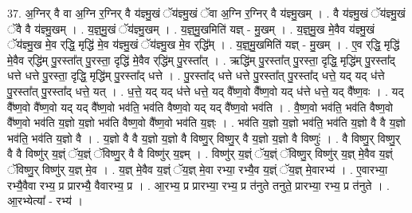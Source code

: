 \documentclass[17pt]{extarticle}
\begin{document}
37. अ॒ग्निर् वै वा अ॒ग्नि र॒ग्निर् वै य॑ज्ञ्मु॒खं ॅय॑ज्ञ्मु॒खं ॅवा अ॒ग्नि र॒ग्निर् वै य॑ज्ञ्मु॒खम् । . वै य॑ज्ञ्मु॒खं ॅय॑ज्ञ्मु॒खं ॅवै वै य॑ज्ञ्मु॒खम् । . य॒ज्ञ्॒मु॒खं ॅय॑ज्ञ्मु॒खम् । . य॒ज्ञ्॒मु॒खमिति॑ यज्ञ् - मु॒खम् । . य॒ज्ञ्॒मु॒ख मे॒वैव य॑ज्ञ्मु॒खं ॅय॑ज्ञ्मु॒ख मे॒व र्‌द्धि॒ मृद्धि॑ मे॒व य॑ज्ञ्मु॒खं ॅय॑ज्ञ्मु॒ख मे॒व र्‌द्धि᳚म् । . य॒ज्ञ्॒मु॒खमिति॑ यज्ञ् - मु॒खम् । . ए॒व र्‌द्धि॒ मृद्धि॑ मे॒वैव र्‌द्धि॑म् पु॒रस्ता᳚त् पु॒रस्ता॒ दृद्धि॑ मे॒वैव र्‌द्धि॑म् पु॒रस्ता᳚त् । . ऋद्धि॑म् पु॒रस्ता᳚त् पु॒रस्ता॒ दृद्धि॒ मृद्धि॑म् पु॒रस्ता᳚द् धत्ते धत्ते पु॒रस्ता॒ दृद्धि॒ मृद्धि॑म् पु॒रस्ता᳚द् धत्ते । . पु॒रस्ता᳚द् धत्ते धत्ते पु॒रस्ता᳚त् पु॒रस्ता᳚द् धत्ते॒ यद् यद् ध॑त्ते पु॒रस्ता᳚त् पु॒रस्ता᳚द् धत्ते॒ यत् । . ध॒त्ते॒ यद् यद् ध॑त्ते धत्ते॒ यद् वै᳚ष्ण॒वो वै᳚ष्ण॒वो यद् ध॑त्ते धत्ते॒ यद् वै᳚ष्ण॒वः । . यद् वै᳚ष्ण॒वो वै᳚ष्ण॒वो यद् यद् वै᳚ष्ण॒वो भव॑ति॒ भव॑ति वैष्ण॒वो यद् यद् वै᳚ष्ण॒वो भव॑ति । . वै॒ष्ण॒वो भव॑ति॒ भव॑ति वैष्ण॒वो वै᳚ष्ण॒वो भव॑ति य॒ज्ञो य॒ज्ञो भव॑ति वैष्ण॒वो वै᳚ष्ण॒वो भव॑ति य॒ज्ञ्ः । . भव॑ति य॒ज्ञो य॒ज्ञो भव॑ति॒ भव॑ति य॒ज्ञो वै वै य॒ज्ञो भव॑ति॒ भव॑ति य॒ज्ञो वै । . य॒ज्ञो वै वै य॒ज्ञो य॒ज्ञो वै विष्णु॒र् विष्णु॒र् वै य॒ज्ञो य॒ज्ञो वै विष्णुः॑ । . वै विष्णु॒र् विष्णु॒र् वै वै विष्णु॑र् य॒ज्ञ्ं ॅय॒ज्ञ्ं ॅविष्णु॒र् वै वै विष्णु॑र् य॒ज्ञ्म् । . विष्णु॑र् य॒ज्ञ्ं ॅय॒ज्ञ्ं ॅविष्णु॒र् विष्णु॑र् य॒ज्ञ् मे॒वैव य॒ज्ञ्ं ॅविष्णु॒र् विष्णु॑र् य॒ज्ञ् मे॒व । . य॒ज्ञ् मे॒वैव य॒ज्ञ्ं ॅय॒ज्ञ् मे॒वा रभ्या॒ रभ्यै॒व य॒ज्ञ्ं ॅय॒ज्ञ् मे॒वारभ्य॑ । . ए॒वारभ्या॒ रभ्यै॒वैवा रभ्य॒ प्र प्रारभ्यै॒ वैवारभ्य॒ प्र । . आ॒रभ्य॒ प्र प्रारभ्या॒ रभ्य॒ प्र त॑नुते तनुते॒ प्रारभ्या॒ रभ्य॒ प्र त॑नुते । . आ॒रभ्येत्या᳚ - रभ्य॑ । \newline
\end{document}
